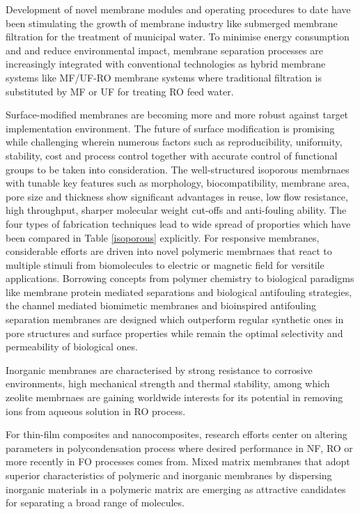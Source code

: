 \documentclass[a4paper,12pt]{report}
\begin{document}
Development of novel membrane modules and operating procedures to date have been stimulating the growth of membrane industry like submerged membrane filtration for the treatment of municipal water. To minimise energy consumption and and reduce environmental impact, membrane separation processes are increasingly integrated with conventional technologies as hybrid membrane systems like MF/UF-RO membrane systems where traditional filtration is substituted by MF or UF for treating RO feed water.

Surface-modified membranes are becoming more and more robust against target implementation environment. The future of surface modification is promising while challenging wherein numerous factors such as reproducibility, uniformity, stability, cost and process control together with accurate control of functional groups to be taken into consideration. The well-structured isoporous membrnaes with tunable key features such as morphology, biocompatibility, membrane area, pore size and thickness show significant advantages in reuse, low flow resistance, high throughput, sharper molecular weight cut-offs and anti-fouling ability. The four types of fabrication techniques lead to wide spread of proporties which have been compared in Table \ref{isoporous} explicitly. For responsive membranes, considerable efforts are driven into novel polymeric membrnaes that react to multiple stimuli from biomolecules to electric or magnetic field for versitile applications. Borrowing concepts from polymer chemistry to biological paradigms like membrane protein mediated separations and biological antifouling strategies, the channel mediated biomimetic membranes and bioinspired antifouling separation membranes are designed which outperform regular synthetic ones in pore structures and surface properties while remain the optimal selectivity and permeability of biological ones. 

Inorganic membranes are characterised by strong resistance to corrosive environments, high mechanical strength and thermal stability, among which zeolite membrnaes are gaining worldwide interests for its potential in removing ions from aqueous solution in RO process. 

For thin-film composites and nanocomposites, research efforts center on altering parameters in polycondensation process where desired performance in NF, RO or more recently in FO processes comes from. Mixed matrix membranes that adopt superior characteristics of polymeric and inorganic membranes by dispersing inorganic materials in a polymeric matrix are emerging as attractive candidates for separating a broad range of molecules.
\end{document}
